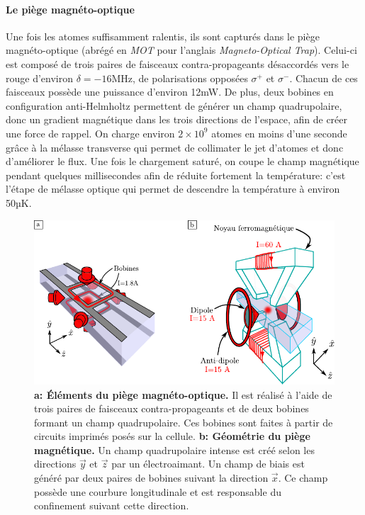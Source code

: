 \paragraph*{Le piège magnéto-optique}
Une fois les atomes suffisamment ralentis, ils sont capturés dans le piège magnéto-optique (abrégé en \emph{MOT} pour l'anglais \textit{Magneto-Optical Trap}). Celui-ci est composé de trois paires de faisceaux contra-propageants désaccordés vers le rouge d'environ $\delta=-16$MHz, de polarisations opposées $\sigma^+$ et $\sigma^-$. Chacun de ces faisceaux possède une puissance d'environ 12mW.
De plus, deux bobines en configuration anti-Helmholtz permettent de générer un champ quadrupolaire, donc un gradient magnétique dans les trois directions de l'espace, afin de créer une force de rappel.
On charge environ $2 \times 10^9$ atomes en moins d'une seconde grâce à la mélasse transverse qui permet de collimater le jet d'atomes et donc d'améliorer le flux. 
Une fois le chargement saturé, on coupe le champ magnétique pendant quelques millisecondes afin de réduite fortement la température: c'est l'étape de mélasse optique qui permet de descendre la température à environ 50µK. 

\begin{figure}
\centering
\includegraphics[width=\textwidth]{Fig/BEC_manip/MOT_magtrap.pdf}
\caption{\textbf{a: Éléments du piège magnéto-optique.} Il est réalisé à l'aide de trois paires de faisceaux contra-propageants et de deux bobines formant un champ quadrupolaire. Ces bobines sont faites à partir de circuits imprimés posés sur la cellule. \textbf{b: Géométrie du piège magnétique.} Un champ quadrupolaire intense est créé selon les directions $\vec{y}$ et $\vec{z}$ par un électroaimant. Un champ de biais est généré par deux paires de bobines suivant la direction $\vec{x}$. Ce champ possède une courbure longitudinale et est responsable du confinement suivant cette direction. }
\label{fig:MOT_magtrap}
\end{figure}

